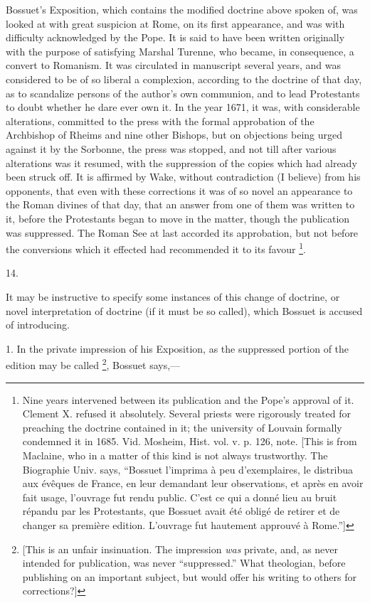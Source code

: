 Bossuet's Exposition, which contains the modified
doctrine above spoken of, was looked at with great suspicion at Rome,
on its first appearance, and was with difficulty acknowledged by the
Pope. It is said to have been written originally with the purpose of
satisfying Marshal Turenne, who became, in consequence, a convert to
Romanism. It was circulated in manuscript several years, and was
considered to be of so liberal a complexion, according to the
doctrine of that day, as to scandalize persons of the author's own
communion, and to lead Protestants to doubt whether he dare ever own
it. In the year 1671, it was, with considerable alterations, committed
to the press with the formal approbation of the Archbishop of Rheims
and nine other Bishops, but on objections being urged against it by
the Sorbonne, the press was stopped, and not till after various
alterations was it resumed, with the suppression of the copies which
had already been struck off. It is affirmed by Wake, without
contradiction (I believe) from his opponents, that even with these
corrections it was of so novel an appearance to the Roman divines of
that day, that an answer from one of them was written to it, before
the Protestants began to move in the matter, though the publication
was suppressed. The Roman See at last accorded its approbation, but
not before the conversions which it effected had recommended it to its
favour \footnote{Nine years intervened between its publication and the Pope's approval
of it. Clement X. refused it absolutely. Several priests were
rigorously treated for preaching the doctrine contained in it; the
university of Louvain formally condemned it in 1685. Vid. Mosheim,
Hist. vol. v. p. 126, note. [This is from Maclaine, who in a matter of
this kind is not always trustworthy. The Biographie Univ. says, ``Bossuet
l'imprima à peu d'exemplaires, le distribua aux évêques de France,
en leur demandant leur observations, et après en avoir fait usage, l'ouvrage
fut rendu public. C'est ce qui a donné lieu au bruit répandu par les
Protestants, que Bossuet avait été obligé de retirer et de changer
sa première edition. L'ouvrage fut hautement approuvé à
Rome.'']}.

14.

It may be instructive to specify some instances
of this change of doctrine, or novel interpretation of doctrine (if it
must be so called), which Bossuet is accused of introducing.

1. In the private impression of his Exposition,
as the suppressed portion of the edition may be called \footnote{[This is an unfair insinuation. The impression \emph{was} private, and, as
never intended for publication, was never ``suppressed.'' What
theologian, before publishing on an important subject, but would offer
his writing to others for corrections?]}, Bossuet says,—

